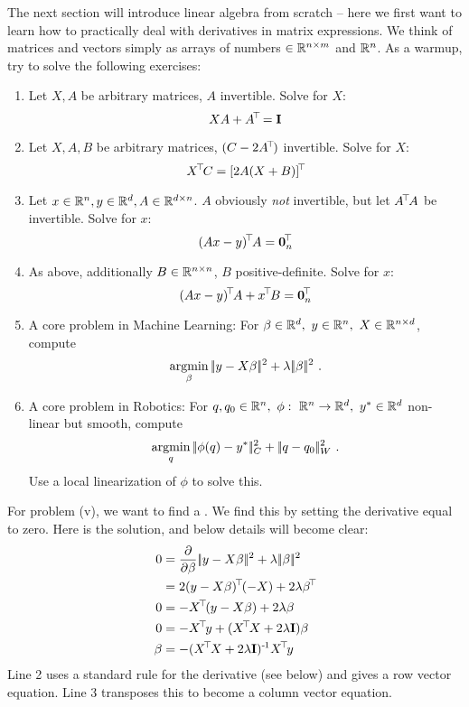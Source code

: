 The next section will introduce linear algebra from scratch -- here we first want to learn how to practically deal with derivatives in matrix expressions. We think of matrices and vectors simply as arrays of numbers $\in {\mathbb{R}}^{n\times m}$ and ${\mathbb{R}}^n$. As a warmup, try to solve the following exercises:
\begin{enumerate}
\item Let $X,A$ be arbitrary matrices, $A$ invertible. Solve for $X$:
\begin{equation}
 X A + A^{\!\top\!} = {\rm\bf I} 
\end{equation}

\item Let $X,A,B$ be arbitrary matrices, $(C-2A^{\!\top\!})$ invertible. Solve for $X$:
\begin{equation}
 X^{\!\top\!} C = [2 A (X + B)]^{\!\top\!} 
\end{equation}

\item Let $x\in{\mathbb{R}}^n,y\in{\mathbb{R}}^d,A\in{\mathbb{R}}^{d\times n}$. $A$ obviously \emph{not}
invertible, but let $A^{\!\top\!} A$ be invertible. Solve for $x$:
\begin{equation}
 (A x - y)^{\!\top\!} A = \boldsymbol 0_n^{\!\top\!} 
\end{equation}

\item As above, additionally $B\in{\mathbb{R}}^{n\times n}$, $B$
positive-definite. Solve for $x$: 
\begin{equation}
 (A x - y)^{\!\top\!} A + x^{\!\top\!} B = \boldsymbol 0_n^{\!\top\!} 
\end{equation}

\item A core problem in Machine Learning: For $\beta\in{\mathbb{R}}^d,~ y\in{\mathbb{R}}^n,~ X
\in{\mathbb{R}}^{n\times d}$, compute
\begin{equation}
\operatorname*{argmin}_\beta |\!|y - X \beta|\!|^2 + \lambda |\!|\beta|\!|^2 ~.
\end{equation}

\item A core problem in Robotics: For
$q,q_0\in{\mathbb{R}}^n,~ \phi:~ {\mathbb{R}}^n \to {\mathbb{R}}^d,~ y^*\in{\mathbb{R}}^d$ non-linear but
smooth, compute
\begin{equation}
\operatorname*{argmin}_q |\!|\phi(q) - y^*|\!|^2_C + |\!|q-q_0|\!|_W^2 ~.
\end{equation}
Use a local linearization of $\phi$ to solve this.
\end{enumerate}

For problem (v), we want to find a . We find this by setting the derivative equal to zero. Here is the solution, and below details will become clear:
\begin{align}
0 &= \Del{\b} \norm{y - X \b}^2 + \l \norm{\b}^2 \\
&= 2 (y - X\b)^\T (-X) + 2 \l \b^\T \\
0 &= - X^\T (y - X\b) + 2 \l \b \\
0 &= - X^\T y + (X^\T X + 2 \l \Id) \b \\
\b &= - (X^\T X + 2 \l \Id)^\1 X^\T y
\end{align}
Line 2 uses a standard rule for the derivative (see below) and gives a
row vector equation. Line 3 transposes this to become a column vector
equation.


